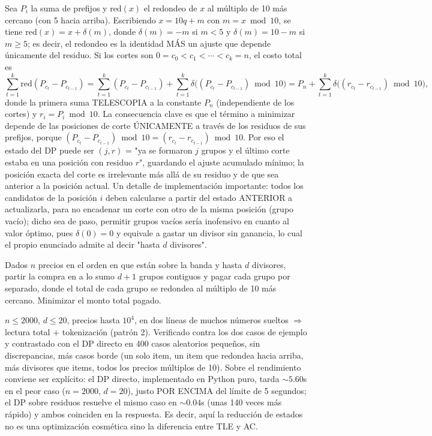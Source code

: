  Sea $P_i$ la suma de prefijos y $\mathrm{red}(x)$ el redondeo de $x$ al múltiplo de 10 más cercano (con 5 hacia arriba). Escribiendo $x = 10q + m$ con $m = x \bmod 10$, se tiene $\mathrm{red}(x) = x + \delta(m)$, donde $\delta(m) = -m$ si $m < 5$ y $\delta(m) = 10 - m$ si $m \ge 5$; es decir, el redondeo es la identidad MÁS un ajuste que depende únicamente del residuo. Si los cortes son $0 = c_0 < c_1 < \cdots < c_k = n$, el costo total es
$$\sum_{t=1}^{k} \mathrm{red}(P_{c_t} - P_{c_{t-1}}) = \sum_{t=1}^{k}(P_{c_t} - P_{c_{t-1}}) + \sum_{t=1}^{k}\delta\big((P_{c_t} - P_{c_{t-1}}) \bmod 10\big) = P_n + \sum_{t=1}^{k}\delta\big((r_{c_t} - r_{c_{t-1}}) \bmod 10\big),$$
donde la primera suma TELESCOPIA a la constante $P_n$ (independiente de los cortes) y $r_i = P_i \bmod 10$. La consecuencia clave es que el término a minimizar depende de las posiciones de corte ÚNICAMENTE a través de los residuos de sus prefijos, porque $(P_{c_t} - P_{c_{t-1}}) \bmod 10 = (r_{c_t} - r_{c_{t-1}}) \bmod 10$. Por eso el estado del DP puede ser $(j, r)$ = "ya se formaron $j$ grupos y el último corte estaba en una posición con residuo $r$", guardando el ajuste acumulado mínimo; la posición exacta del corte es irrelevante más allá de su residuo y de que sea anterior a la posición actual. Un detalle de implementación importante: todos los candidatos de la posición $i$ deben calcularse a partir del estado ANTERIOR a actualizarla, para no encadenar un corte con otro de la misma posición (grupo vacío); dicho sea de paso, permitir grupos vacíos sería inofensivo en cuanto al valor óptimo, pues $\delta(0)=0$ y equivale a gastar un divisor sin ganancia, lo cual el propio enunciado admite al decir "hasta $d$ divisores".


Dados $n$ precios en el orden en que están sobre la banda y hasta $d$ divisores, partir la compra en a lo sumo $d+1$ grupos contiguos y pagar cada grupo por separado, donde el total de cada grupo se redondea al múltiplo de 10 más cercano. Minimizar el monto total pagado.

 $n \le 2000$, $d \le 20$, precios hasta $10^4$, en dos líneas de muchos números sueltos $\Rightarrow$ lectura total + tokenización (patrón 2). Verificado contra los dos casos de ejemplo y contrastado con el DP directo  en 400 casos aleatorios pequeños, sin discrepancias, más casos borde (un solo item, un item que redondea hacia arriba, más divisores que items, todos los precios múltiplos de 10). Sobre el rendimiento conviene ser explícito: el DP directo, implementado en Python puro, tarda $\sim5.60$s en el peor caso ($n=2000$, $d=20$), justo POR ENCIMA del límite de 5 segundos; el DP sobre residuos resuelve el mismo caso en $\sim0.04$s (unas 140 veces más rápido) y ambos coinciden en la respuesta. Es decir, aquí la reducción de estados no es una optimización cosmética sino la diferencia entre TLE y AC.

